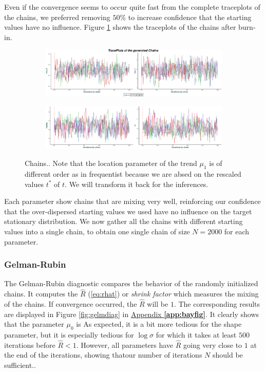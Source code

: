 Even if the convergence seems to occur quite fast from the complete traceplots of the chains, we preferred removing $50\%$ to increase confidence that the starting values have no influence. Figure \ref{fig:mixchains} shows the traceplots of the chains after burn-in.  
\begin{figure}
	\centering
	\begin{subfigure}[b]{0.99\textwidth}
		\includegraphics[width=1\linewidth]{chains1.pdf}
	\end{subfigure}
	
	\begin{subfigure}[b]{0.99\textwidth}
		\includegraphics[width=1\linewidth]{chains2.pdf}
	\end{subfigure}
	\caption{Chains.. Note that the location parameter of the trend $\mu_1$ is of different order as in frequentist because we are absed on the rescaled values $t^*$ of $t$. We will transform it back for the inferences. }\label{fig:mixchains}
\end{figure}
Each parameter show chains that are mixing very well, reinforcing our confidence that the over-dispersed starting values we used have no influence on the target stationary distribution. 
We now gather all the chains with different starting values into a single chain, to obtain one single chain of size $N=2000$ for each parameter.


\subsubsection*{Gelman-Rubin}

The Gelman-Rubin diagnostic compares the behavior of the randomly initialized chains. It computes the $\hat{R}$ (\ref{eq:rhat}) or \emph{shrink factor} which measures the mixing of the chains. If convergence occurred, the $\hat{R}$ will be $1$.
The corresponding results are displayed in Figure \ref{fig:gelmdiag} in \hyperref[app:bayfig]{Appendix \textbf{\ref{app:bayfig}}}. It clearly shows that the parameter $\mu_0$ 
is 
As expected, it is a bit more tedious for the shape parameter, but it is especially tedious for $\log\sigma$ for which it takes at least $500$ iterations before $\hat{R}<1$. However, all parameters have $\hat{R}$ going very close to $1$ at the end of the iterations, showing thatour number of iterations $N$ should be sufficient..



